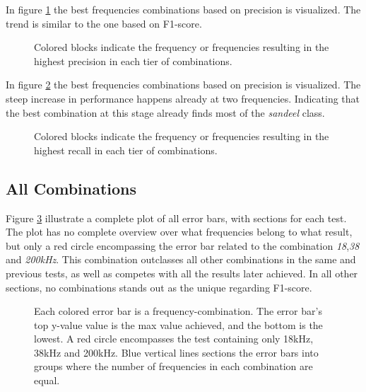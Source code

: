         In figure \ref{increasing_freq_precision_score_fig} the best frequencies combinations based on precision is visualized. The trend is similar to the one based on F1-score.
        \begin{figure}[H]
            \centering
            
            \caption[Best frequency combination - Precision]{Colored blocks indicate the frequency or frequencies resulting in the highest precision in each tier of combinations.}
          	\medskip 
            \label{increasing_freq_precision_score_fig}
        \end{figure}
        
        In figure \ref{increasing_freq_recall_score_fig} the best frequencies combinations based on precision is visualized. The steep increase in performance happens already at two frequencies. Indicating that the best combination at this stage already finds most of the \textit{sandeel} class.
        \begin{figure}[H]
            \centering
            
            \caption[Best frequency combination - Recall]{Colored blocks indicate the frequency or frequencies resulting in the highest recall in each tier of combinations.}
          	\medskip 
            \label{increasing_freq_recall_score_fig}
        \end{figure}

    \subsection{All Combinations}
        Figure \ref{errorbar_fig} illustrate a complete plot of all error bars, with sections for each test. The plot has no complete overview over what frequencies belong to what result, but only a red circle encompassing the error bar related to the combination \textit{18},\textit{38} and \textit{200kHz}. This combination outclasses all other combinations in the same and previous tests, as well as competes with all the results later achieved. In all other sections, no combinations stands out as the unique regarding F1-score.
        
        \begin{figure}[H]
            \centering
            
            \caption[Error bars per combination]{Each colored error bar is a frequency-combination. The error bar's top y-value value is the max value achieved, and the bottom is the lowest. A red circle encompasses the test containing only 18kHz, 38kHz and 200kHz. Blue vertical lines sections the error bars into groups where the number of frequencies in each combination are equal.}
          	\medskip 
            \label{errorbar_fig}
        \end{figure}
        
